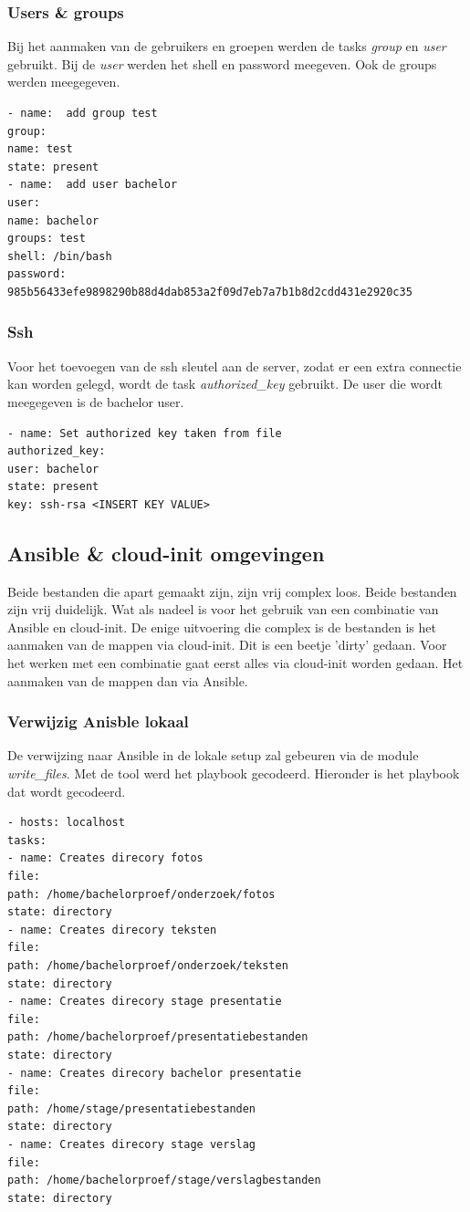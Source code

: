\subsubsection{Users \& groups}
Bij het aanmaken van de gebruikers en groepen werden de tasks \textit{group} en \textit{user} gebruikt. Bij de \textit{user} werden het shell en password meegeven. Ook de groups werden meegegeven.
\begin{lstlisting}
- name:  add group test
group:
name: test
state: present
- name:  add user bachelor
user:
name: bachelor
groups: test
shell: /bin/bash
password: 985b56433efe9898290b88d4dab853a2f09d7eb7a7b1b8d2cdd431e2920c35
\end{lstlisting}

\subsubsection{Ssh}
Voor het toevoegen van de ssh sleutel aan de server, zodat er een extra connectie kan worden gelegd, wordt de task \textit{authorized\_key} gebruikt. De user die wordt meegegeven is de bachelor user.
\begin{lstlisting}
- name: Set authorized key taken from file
authorized_key:
user: bachelor
state: present
key: ssh-rsa <INSERT KEY VALUE>

\end{lstlisting}

\subsection{Ansible \& cloud-init omgevingen}
Beide bestanden die apart gemaakt zijn, zijn vrij complex loos. Beide bestanden zijn vrij duidelijk. Wat als nadeel is voor het gebruik van een combinatie van Ansible en cloud-init. De enige uitvoering die complex is de bestanden is het aanmaken van de mappen via cloud-init. Dit is een beetje 'dirty' gedaan. Voor het werken met een combinatie gaat eerst alles via cloud-init worden gedaan. Het aanmaken van de mappen dan via Ansible.

\subsubsection{Verwijzig Anisble lokaal}
De verwijzing naar Ansible in de lokale setup zal gebeuren via de module \textit{write\_files}. Met de tool \autocite{toolbas64} werd het playbook gecodeerd. Hieronder is het playbook dat wordt gecodeerd.
\begin{lstlisting}
- hosts: localhost
tasks:
- name: Creates direcory fotos
file:
path: /home/bachelorproef/onderzoek/fotos
state: directory
- name: Creates direcory teksten
file:
path: /home/bachelorproef/onderzoek/teksten
state: directory
- name: Creates direcory stage presentatie
file:
path: /home/bachelorproef/presentatiebestanden
state: directory
- name: Creates direcory bachelor presentatie
file:
path: /home/stage/presentatiebestanden
state: directory
- name: Creates direcory stage verslag
file:
path: /home/bachelorproef/stage/verslagbestanden
state: directory
\end{lstlisting}

